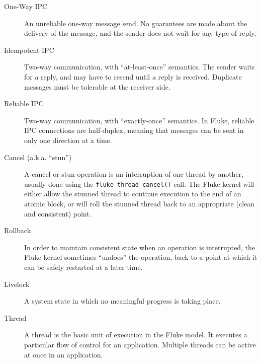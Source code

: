 \documentclass{article}
\begin{document}
\begin{description}
  \item[One-Way IPC] An unreliable one-way message send.  No
guarantees are made about the delivery of the message, and the sender
does not wait for any type of reply.

  \item[Idempotent IPC] Two-way communication, with ``at-least-once''
semantics.  The sender waits for a reply, and may have to resend until
a reply is received.  Duplicate messages must be tolerable at the
receiver side.

  \item[Reliable IPC] Two-way communication, with ``exactly-once''
semantics.  In Fluke, reliable IPC connections are half-duplex,
meaning that messages can be sent in only one direction at a time.

  \item[Cancel (a.k.a. ``stun'')] A cancel or stun operation is an
interruption of one thread by another, usually done using 
the {\tt fluke_thread_cancel()}
call.  The Fluke kernel will either allow the stunned thread to
continue execution to the end of an atomic block, or will roll the
stunned thread back to an appropriate (clean and consistent) point.

  \item[Rollback] In order to maintain consistent state when an
operation is interrupted, the Fluke kernel sometimes ``undoes'' the
operation, back to a point at which it can be safely restarted at a
later time.

  \item[Livelock] A system state in which no meaningful progress
is taking place.

  \item[Thread] A thread is the basic unit of execution in the Fluke
model.  It executes a particular flow of control for an application.
Multiple threads can be active at once in an application.



\end{description}




\end{document}
